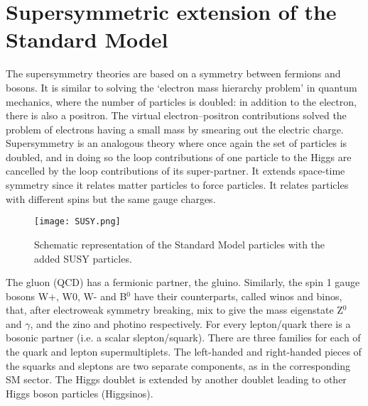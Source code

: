 \section{Supersymmetric extension of the Standard Model}

The supersymmetry theories are based on a symmetry between fermions and bosons. It is similar to solving the `electron mass hierarchy problem' in quantum mechanics, where the number of particles is doubled: in addition to the electron, there is also a positron. The virtual electron--positron contributions solved the problem of electrons having a small mass by smearing out the electric charge. Supersymmetry is an analogous theory where once again the set of particles is doubled, and in doing so the loop contributions of one particle to the Higgs are cancelled by the loop contributions of its super-partner. It extends space-time symmetry since it relates matter particles to force particles. It relates particles with different spins but the same gauge charges.

\begin{figure}[H]
\begin{center}
\texttt{[image: SUSY.png]} 
\caption[Schematic representation of the Standard Model particles with the added SUSY particles.]{Schematic representation of the Standard Model particles with the added SUSY particles.}
\label{SUSY} 
\end{center}
\end{figure}

The gluon (QCD) has a fermionic partner, the gluino. Similarly, the spin 1 gauge bosons W+, W0, W- and B$^0$ have their counterparts, called winos and binos, that, after electroweak symmetry breaking, mix to give the mass eigenstate Z$^0$ and $\gamma$, and the zino and photino respectively. For every lepton/quark there is a bosonic partner (i.e. a scalar slepton/squark). There are three families for each of the quark and lepton supermultiplets. The left-handed and right-handed pieces of the squarks and sleptons are two separate components, as in the corresponding SM sector. The Higgs doublet is extended by another doublet leading to other Higgs boson particles (Higgsinos).\\

